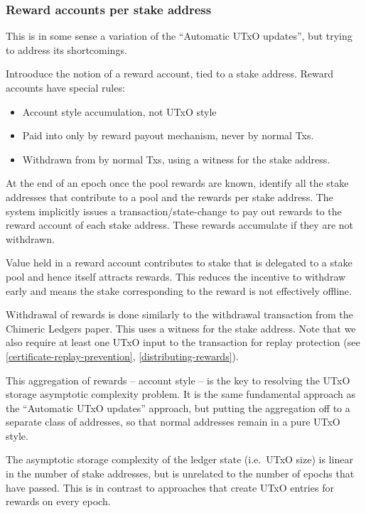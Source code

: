 \documentclass[11pt,a4paper,dvipsnames,twosided]{article}
\begin{document}
\subsubsection{Reward accounts per stake address}
\label{reward-accounts-per-stake-key}

This is in some sense a variation of the ``Automatic UTxO updates'', but
trying to address its shortcomings.

Introoduce the notion of a reward account, tied to a stake address.
Reward accounts have special rules:

\begin{itemize}
\item
  Account style accumulation, not UTxO style
\item
  Paid into only by reward payout mechanism, never by normal Txs.
\item
  Withdrawn from by normal Txs, using a witness for the stake address.
\end{itemize}

At the end of an epoch once the pool rewards are known, identify all the
stake addresses that contribute to a pool and the rewards per stake address. The
system implicitly issues a transaction/state-change to pay out rewards
to the reward account of each stake address. These rewards accumulate if they are
not withdrawn.

Value held in a reward account contributes to stake that is delegated to a stake
pool and hence itself attracts rewards. This reduces the incentive to withdraw
early and means the stake corresponding to the reward is not effectively
offline.

Withdrawal of rewards is done similarly to the withdrawal transaction from the
Chimeric Ledgers paper. This uses a witness for the stake address. Note that we
also require at least one UTxO input to the transaction for replay protection
(see \cref{certificate-replay-prevention}, \cref{distributing-rewards}).

This aggregation of rewards -- account style -- is the key to resolving
the UTxO storage asymptotic complexity problem. It is the same
fundamental approach as the ``Automatic UTxO updates'' approach, but
putting the aggregation off to a separate class of addresses, so
that normal addresses remain in a pure UTxO style.

The asymptotic storage complexity of the ledger state (i.e.~UTxO size)
is linear in the number of stake addresses, but is unrelated to the number of
epochs that have passed. This is in contrast to approaches that create
UTxO entries for rewards on every epoch.
\end{document}

